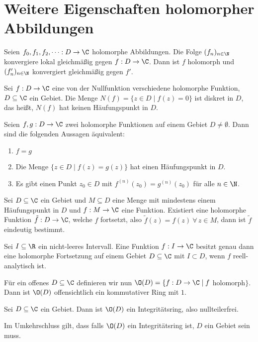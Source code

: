 \section[Weitere Eigenschaften]{Weitere Eigenschaften holomorpher Abbildungen}\lecture
		
		\begin{thm}[Weierstraß, 1841]\label{2.5.1}
			Seien $ f_0,f_1,f_2,\dots: D \to \C $ holomorphe Abbildungen. Die Folge $ (f_n)_{n \in  \N} $ konvergiere lokal gleichmäßig gegen $f: D \to \C$. Dann ist $f$ holomorph und $ (f'_n)_{n \in \N} $ konvergiert gleichmäßig gegen $f'$.
		\end{thm}
		
		\begin{thm}
			Sei $f: D \to \C$ eine von der Nullfunktion verschiedene holomorphe Funktion, $D \subseteq \C$ ein Gebiet. Die Menge $N(f) = \{z \in D \mid f(z) = 0\}$ ist diskret in $D$, das heißt, $N(f)$ hat keinen Häufungspunkt in $D$. 
		\end{thm}
		
		\begin{corn}
			Seien $f,g: D \to \C$ zwei holomorphe Funktionen auf einem Gebiet $ D \neq \emptyset $. Dann sind die folgenden Aussagen äquivalent:
			\begin{enumerate}[label={\roman*})]
				\item $f=g$
				\item Die Menge $ \{z \in D \mid f(z)=g(z)\} $ hat einen Häufungspunkt in $D$.
				\item Es gibt einen Punkt $z_0 \in D$ mit $ f^{(n)}(z_0) = g^{(n)}(z_0) $ für alle $n \in \N$.
			\end{enumerate}
		\end{corn}
		
		\begin{corn}
			Sei $D \subseteq \C$ ein Gebiet und $M \subseteq D$ eine Menge mit mindestens einem Häufungspunkt in $D$ und $f: M \to \C$ eine Funktion. Existiert eine holomorphe Funktion $\tilde{f}: D \to \C$, welche $f$ fortsetzt, also $\tilde{f}(z) = f(z) \ \forall\, z \in M$, dann ist $\tilde{f}$ eindeutig bestimmt.
		\end{corn}
		
		\begin{prop}
			Sei $I \subseteq \R $ ein nicht-leeres Intervall. Eine Funktion $ f: I \to \C $ besitzt genau dann eine holomorphe Fortsetzung auf einem Gebiet $ D \subseteq \C $ mit $ I \subset D $, wenn $f$ reell-analytisch ist.
		\end{prop}
		
		Für ein offenes $D \subseteq \C$ definieren wir nun $ \O(D) = \{ f: D \to \C \mid f $ holomorph$ \} $. Dann ist $ \O(D) $ offensichtlich ein kommutativer Ring mit $1$.
			
		\begin{prop}
			Sei $D \subseteq \C$ ein Gebiet. Dann ist $\O(D)$ ein Integritätsring, also nullteilerfrei.
		\end{prop}
		
		\begin{cor}
			Im Umkehrschluss gilt, dass falls $\O(D)$ ein Integritätsring ist, $D$ ein Gebiet sein muss.
		\end{cor}